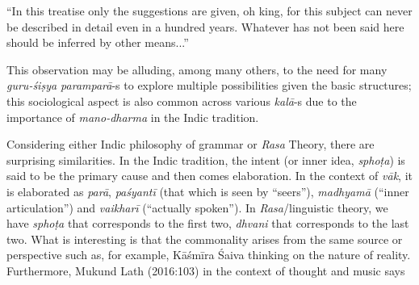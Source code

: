 \begin{myquote}
“In this treatise only the suggestions are given, oh king, for this subject can never be described in detail even in a hundred years. Whatever has not been said here should be inferred by other means...” 
\end{myquote}

This observation may be alluding, among many others, to the need for many \textsl{guru-śiṣya paramparā}-s to explore multiple possibilities given the basic structures; this sociological aspect is also common across various \textsl{kalā}-s due to the importance of \textsl{mano-dharma} in the Indic tradition. 

Considering either Indic philosophy of grammar or \textsl{Rasa} Theory, there are surprising similarities. In the Indic tradition, the intent (or inner idea, \textsl{sphoṭa}) is said to be the primary cause and then comes elaboration. In the context of \textsl{vāk}, it is elaborated as \textsl{parā}, \textsl{paśyantī} (that which is seen by “seers”), \textsl{madhyamā} (“inner articulation”) and \textsl{vaikharī} (“actually spoken”). In \textsl{Rasa}/linguistic theory, we have \textsl{sphoṭa} that corresponds to the first two, \textsl{dhvani} that corresponds to the last two. What is interesting is that the commonality arises from the same source or perspective such as, for example, Kāśmīra Śaiva thinking on the nature of reality. Furthermore, Mukund Lath (2016:103) in the context of thought and music says 

